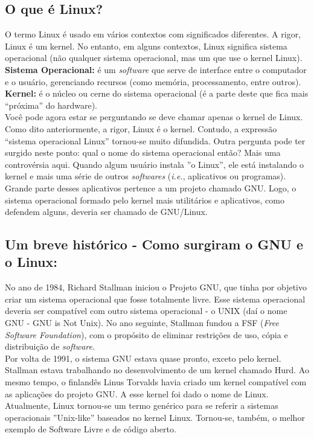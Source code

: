 \begin{refsection}
\renewcommand*{\finalnamedelim}{\addspace\&\space}%

\section{O que é Linux?}\label{tut1:linux}
O termo Linux é usado em vários contextos com significados diferentes. A rigor, Linux é um kernel. No entanto, em alguns contextos, Linux significa sistema operacional (não qualquer sistema operacional, mas um que use o kernel Linux).\\

\textbf{Sistema Operacional:} é um \textit{software} que serve de interface entre o computador e o usuário, gerenciando recursos (como memória, processamento, entre outros).\\

\textbf{Kernel:} é o núcleo ou cerne do sistema operacional (é a parte deste que fica mais ``próxima'' do hardware).\\

Você pode agora estar se perguntando se deve chamar apenas o kernel de Linux. Como dito anteriormente, a rigor, Linux é o kernel. Contudo, a expressão ``sistema operacional Linux'' tornou-se muito difundida. Outra pergunta pode ter surgido neste ponto: qual o nome do sistema operacional então? Mais uma controvérsia aqui. Quando algum usuário instala ''o Linux'', ele está instalando o kernel e mais uma série de outros \textit{softwares} (\textit{i.e.}, aplicativos ou programas). Grande parte desses aplicativos pertence a um projeto chamado GNU. Logo, o sistema operacional formado pelo kernel mais utilitários e aplicativos, como defendem alguns, deveria ser chamado de GNU/Linux.\\

\subsection{Um breve histórico - Como surgiram o GNU e o Linux:}\label{tut1:linux:history}
No ano de 1984, Richard Stallman iniciou o Projeto GNU, que tinha por objetivo criar um sistema operacional que fosse totalmente livre. Esse sistema operacional deveria ser compatível com outro sistema operacional - o UNIX (daí o nome GNU - GNU is Not Unix). No ano seguinte, Stallman fundou a FSF (\textit{Free Software Foundation}), com o propósito de eliminar restrições de uso, cópia e distribuição de \textit{software}.\\
Por volta de 1991, o sistema GNU estava quase pronto, exceto pelo kernel. Stallman estava trabalhando no desenvolvimento de um kernel chamado Hurd. Ao mesmo tempo, o finlandês Linus Torvalds havia criado um kernel compatível com as aplicações do projeto GNU. A esse kernel foi dado o nome de Linux. Atualmente, Linux tornou-se um termo genérico para se referir a sistemas operacionais ''Unix-like'' baseados no kernel Linux. Tornou-se, também, o melhor exemplo de Software Livre e de código aberto.\\


\end{refsection}
